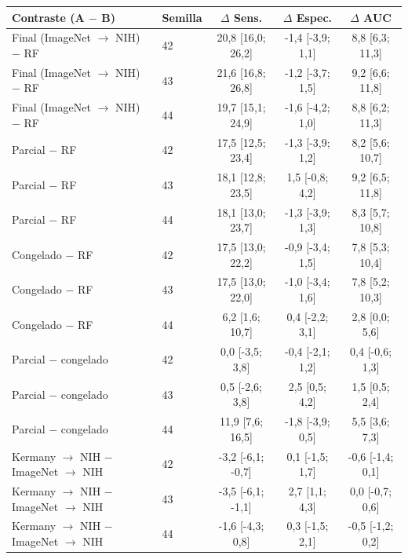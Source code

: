 \begin{tabular}{llccc}
\toprule
Contraste (A $-$ B) & Semilla & $\Delta$ Sens. & $\Delta$ Espec. & $\Delta$ AUC \\
\midrule
Final (ImageNet $\to$ NIH) $-$ RF & 42 & 20{,}8 [16{,}0; 26{,}2] & -1{,}4 [-3{,}9; 1{,}1] & 8{,}8 [6{,}3; 11{,}3] \\
Final (ImageNet $\to$ NIH) $-$ RF & 43 & 21{,}6 [16{,}8; 26{,}8] & -1{,}2 [-3{,}7; 1{,}5] & 9{,}2 [6{,}6; 11{,}8] \\
Final (ImageNet $\to$ NIH) $-$ RF & 44 & 19{,}7 [15{,}1; 24{,}9] & -1{,}6 [-4{,}2; 1{,}0] & 8{,}8 [6{,}2; 11{,}3] \\
Parcial $-$ RF & 42 & 17{,}5 [12{,}5; 23{,}4] & -1{,}3 [-3{,}9; 1{,}2] & 8{,}2 [5{,}6; 10{,}7] \\
Parcial $-$ RF & 43 & 18{,}1 [12{,}8; 23{,}5] & 1{,}5 [-0{,}8; 4{,}2] & 9{,}2 [6{,}5; 11{,}8] \\
Parcial $-$ RF & 44 & 18{,}1 [13{,}0; 23{,}7] & -1{,}3 [-3{,}9; 1{,}3] & 8{,}3 [5{,}7; 10{,}8] \\
Congelado $-$ RF & 42 & 17{,}5 [13{,}0; 22{,}2] & -0{,}9 [-3{,}4; 1{,}5] & 7{,}8 [5{,}3; 10{,}4] \\
Congelado $-$ RF & 43 & 17{,}5 [13{,}0; 22{,}0] & -1{,}0 [-3{,}4; 1{,}6] & 7{,}8 [5{,}2; 10{,}3] \\
Congelado $-$ RF & 44 & 6{,}2 [1{,}6; 10{,}7] & 0{,}4 [-2{,}2; 3{,}1] & 2{,}8 [0{,}0; 5{,}6] \\
Parcial $-$ congelado & 42 & 0{,}0 [-3{,}5; 3{,}8] & -0{,}4 [-2{,}1; 1{,}2] & 0{,}4 [-0{,}6; 1{,}3] \\
Parcial $-$ congelado & 43 & 0{,}5 [-2{,}6; 3{,}8] & 2{,}5 [0{,}5; 4{,}2] & 1{,}5 [0{,}5; 2{,}4] \\
Parcial $-$ congelado & 44 & 11{,}9 [7{,}6; 16{,}5] & -1{,}8 [-3{,}9; 0{,}5] & 5{,}5 [3{,}6; 7{,}3] \\
Kermany $\to$ NIH $-$ ImageNet $\to$ NIH & 42 & -3{,}2 [-6{,}1; -0{,}7] & 0{,}1 [-1{,}5; 1{,}7] & -0{,}6 [-1{,}4; 0{,}1] \\
Kermany $\to$ NIH $-$ ImageNet $\to$ NIH & 43 & -3{,}5 [-6{,}1; -1{,}1] & 2{,}7 [1{,}1; 4{,}3] & 0{,}0 [-0{,}7; 0{,}6] \\
Kermany $\to$ NIH $-$ ImageNet $\to$ NIH & 44 & -1{,}6 [-4{,}3; 0{,}8] & 0{,}3 [-1{,}5; 2{,}1] & -0{,}5 [-1{,}2; 0{,}2] \\
\bottomrule
\end{tabular}
